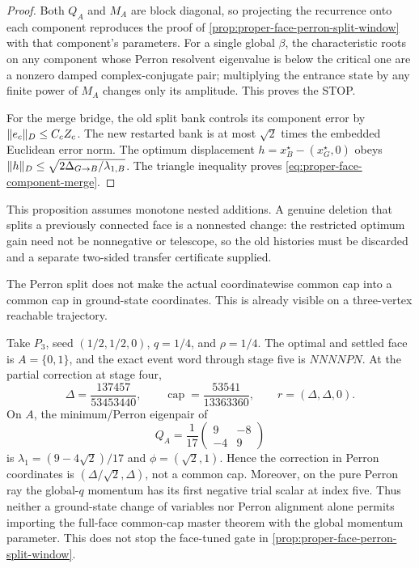 \documentclass[11pt]{article}
\begin{document}
\begin{proof}
Both $Q_A$ and $M_A$ are block diagonal, so projecting the recurrence onto
each component reproduces the proof of
\cref{prop:proper-face-perron-split-window} with that component's parameters.
For a single global $\beta$, the characteristic roots on any component whose
Perron resolvent eigenvalue is below the critical one are a nonzero damped
complex-conjugate pair; multiplying the entrance state by any finite power
of $M_A$ changes only its amplitude.  This proves the STOP.

For the merge bridge, the old split bank controls its component error by
$\lVert e_c\rVert_D\leq C_cZ_c$.  The new restarted bank is at most
$\sqrt2$ times the embedded Euclidean error norm.  The optimum displacement
$h=x_B^\star-(x_G^\star,0)$ obeys
$\lVert h\rVert_D\leq\sqrt{2\Delta_{G\to B}/\lambda_{1,B}}$.
The triangle inequality proves
\cref{eq:proper-face-component-merge}.
\end{proof}

This proposition assumes monotone nested additions.  A genuine deletion
that splits a previously connected face is a nonnested change: the restricted
optimum gain need not be nonnegative or telescope, so the old histories must
be discarded and a separate two-sided transfer certificate supplied.

The Perron split does not make the actual coordinatewise common cap into a
common cap in ground-state coordinates.  This is already visible on a
three-vertex reachable trajectory.

\begin{proposition}
\label{prop:p3-proper-perron-cap-stop}
Take $P_3$, seed $(1/2,1/2,0)$, $q=1/4$, and $\rho=1/4$.  The optimal and
settled face is $A=\{0,1\}$, and the exact event word through stage five is
$NNNNPN$.  At the partial correction at stage four,
\begin{equation*}
 \Delta=\frac{137457}{53453440},\qquad
 \operatorname{cap}=\frac{53541}{13363360},\qquad
 r=(\Delta,\Delta,0).
\end{equation*}
On $A$, the minimum/Perron eigenpair of
\begin{equation*}
 Q_A=\frac1{17}\begin{pmatrix}9&-8\\-4&9\end{pmatrix}
\end{equation*}
is $\lambda_1=(9-4\sqrt2)/17$ and $\phi=(\sqrt2,1)$.  Hence the correction
in Perron coordinates is $(\Delta/\sqrt2,\Delta)$, not a common cap.
Moreover, on the pure Perron ray the global-$q$ momentum has its first
negative trial scalar at index five.  Thus neither a ground-state change of
variables nor Perron alignment alone permits importing the full-face
common-cap master theorem with the global momentum parameter.  This does not
stop the face-tuned gate in
\cref{prop:proper-face-perron-split-window}.
\end{proposition}
\end{document}
